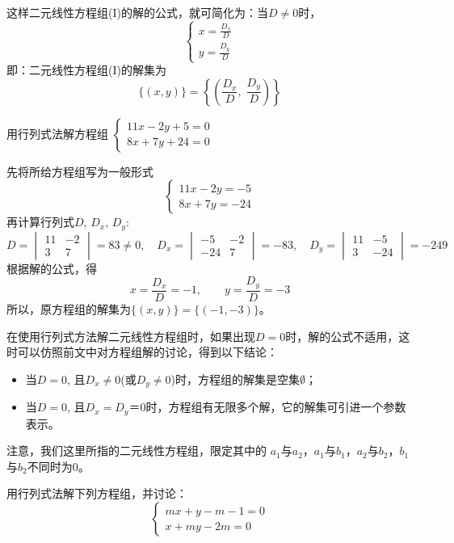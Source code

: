 这样二元线性方程组(I)的解的公式，就可简化为：当$D\ne 0$时，
\[\begin{cases}
    x=\frac{D_x}{D}\\y=\frac{D_y}{D}
\end{cases}\]
即：二元线性方程组(I)的解集为
\[\{(x,y)\}=\left\{\left(\frac{D_x}{D},\; \frac{D_y}{D}\right)\right\}\]

\begin{example}
    用行列式法解方程组
    $\begin{cases}
11x-2y+5=0\\
8x+7y+24=0        
    \end{cases}$
\end{example}

\begin{solution}
    先将所给方程组写为一般形式
\[\begin{cases}
    11x-2y=-5\\
    8x+7y=-24
\end{cases}\]
再计算行列式$D$, $D_x$, $D_y$:
\[D=\begin{vmatrix}
    11&-2\\3&7
\end{vmatrix}=83\ne 0,\quad  D_x=\begin{vmatrix}
    -5&-2\\-24&7
\end{vmatrix}=-83,\quad  D_y=\begin{vmatrix}
    11&-5\\3&-24
\end{vmatrix}=-249\]
根据解的公式，得
\[x=\frac{D_x}{D}=-1,\qquad y=\frac{D_y}{D}=-3\]
所以，原方程组的解集为$\{(x,y)\}=\{(-1,-3)\}$。
\end{solution}

在使用行列式方法解二元线性方程组时，如果出现$D=0$时，解的公式不适用，这时可以仿照前文中对方程组解的讨论，得到以下结论：
\begin{itemize}
    \item 当$D=0$, 且$D_x\ne 0$(或$D_y\ne 0$)时，方程组的解集是空集$\emptyset$；
    \item 当$D=0$, 且$D_x=D_y＝0$时，方程组有无限多个解，它的解集可引进一个参数表示。
\end{itemize}

注意，我们这里所指的二元线性方程组，限定其中的
$a_1$与$a_2$，$a_1$与$b_1$，$a_2$与$b_2$，$b_1$与$b_2$不同时为0。

\begin{example}
    用行列式法解下列方程组，并讨论：
    \[\begin{cases}
        mx+y-m-1=0\\
        x+my-2m=0   
    \end{cases}\]
   \end{example}
   
